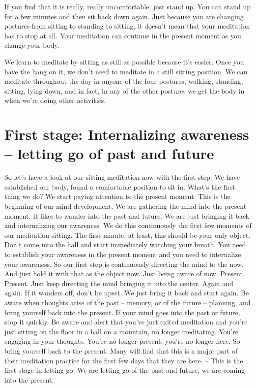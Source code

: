 \documentclass[letterpaper,10pt,english]{sphinxmanual}
\begin{document}
\sphinxAtStartPar
If you find that it is really, really uncomfortable, just stand up. You can
stand up for a few minutes and then sit back down again. Just because you
are changing postures from sitting to standing to sitting, it doesn’t mean that
your meditation has to stop at all. Your meditation can continue in the present moment as you change your body.

\sphinxAtStartPar
We learn to meditate by sitting as still as possible because it’s easier.
Once  you  have  the  hang  on  it,  we  don’t  need  to  meditate  in  a  still  sitting
position. We can meditate throughout the day in anyone of the four postures,
walking, standing, sitting, lying down, and in fact, in any of the other postures we get the body in when we’re doing other activities.


\section{First stage: Internalizing awareness – letting go of past and future}
\label{\detokenize{0-b:first-stage-internalizing-awareness-letting-go-of-past-and-future}}
\sphinxAtStartPar
So let’s have a look at our sitting meditation now with the first step.
We have established our body, found a comfortable position to sit in. What’s
the first thing we do? We start paying attention to the present moment. This
is the beginning of our mind development. We are gathering the mind into
the present moment. It likes to wander into the past and future. We are just
bringing it back and internalizing our awareness. We do this continuously
  the first few moments of our meditation sitting. The first minute, at least, this
should be your only object. Don’t come into the hall and start immediately
watching your breath. You need to establish your awareness in the present
moment  and  you  need  to  internalize  your  awareness.  So  our  first  step  is
continuously directing the mind to the now. And just hold it with that as the
object now. Just being aware of now. Present. Present. Just keep directing
the mind bringing it into the center. Again and again. If it wanders off, don’t
be upset. We just bring it back and start again. Be aware when thoughts arise
of the past – memory, or of the future – planning, and bring yourself back
into the present. If your mind goes into the past or future, stop it quickly.
Be aware and alert that you’ve just exited meditation and you’re just sitting
on the floor in a hall on a mountain, no longer meditating. You’re engaging
in your thoughts. You’re no longer present, you’re no longer here. So bring
yourself back to the present. Many will find that this is a major part of their
meditation practice for the first few days that they are here. – This is the first
stage in letting go. We are letting go of the past and future, we are coming
into the present.
\end{document}
